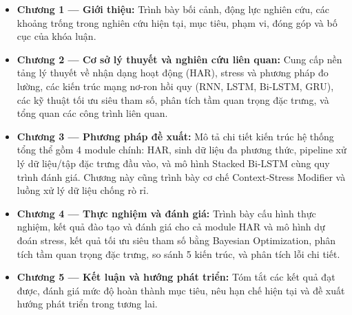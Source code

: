\begin{itemize}
    \item \textbf{Chương 1 — Giới thiệu:} Trình bày bối cảnh, động lực nghiên cứu, các khoảng trống trong nghiên cứu hiện tại, mục tiêu, phạm vi, đóng góp và bố cục của khóa luận.
    
    \item \textbf{Chương 2 — Cơ sở lý thuyết và nghiên cứu liên quan:} Cung cấp nền tảng lý thuyết về nhận dạng hoạt động (HAR), stress và phương pháp đo lường, các kiến trúc mạng nơ-ron hồi quy (RNN, LSTM, Bi-LSTM, GRU), các kỹ thuật tối ưu siêu tham số, phân tích tầm quan trọng đặc trưng, và tổng quan các công trình liên quan.
    
    \item \textbf{Chương 3 — Phương pháp đề xuất:} Mô tả chi tiết kiến trúc hệ thống tổng thể gồm 4 module chính: HAR, sinh dữ liệu đa phương thức, pipeline xử lý dữ liệu/tập đặc trưng đầu vào, và mô hình Stacked Bi-LSTM cùng quy trình đánh giá. Chương này cũng trình bày cơ chế Context-Stress Modifier và luồng xử lý dữ liệu chống rò rỉ.
    
    \item \textbf{Chương 4 — Thực nghiệm và đánh giá:} Trình bày cấu hình thực nghiệm, kết quả đào tạo và đánh giá cho cả module HAR và mô hình dự đoán stress, kết quả tối ưu siêu tham số bằng Bayesian Optimization, phân tích tầm quan trọng đặc trưng, so sánh 5 kiến trúc, và phân tích lỗi chi tiết.
    
    \item \textbf{Chương 5 — Kết luận và hướng phát triển:} Tóm tắt các kết quả đạt được, đánh giá mức độ hoàn thành mục tiêu, nêu hạn chế hiện tại và đề xuất hướng phát triển trong tương lai.
\end{itemize}
